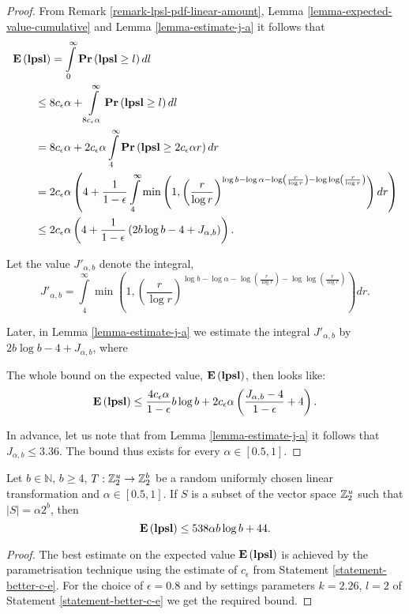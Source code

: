 \begin{proof}
From Remark \ref{remark-lpsl-pdf-linear-amount}, Lemma \ref{lemma-expected-value-cumulative} and Lemma \ref{lemma-estimate-j-a} it follows that
\[
\begin{split}
& \mathbf{E}\left(\mathbf{lpsl}\right)
	= \int\limits_0^\infty \mathbf{Pr}\left(\mathbf{lpsl} \geq l\right) dl \\ 
	& \qquad \leq 8 c_\epsilon \alpha + \int\limits_{8 c_\epsilon \alpha}^\infty \mathbf{Pr}\left(\mathbf{lpsl} \geq l\right) dl \\ 
	& \qquad = 8c_\epsilon \alpha + 2 c_\epsilon \alpha \int\limits_{4}^\infty \mathbf{Pr}\left(\mathbf{lpsl} \geq 2c_\epsilon \alpha r\right) dr \\
	& \qquad = 2c_\epsilon \alpha \left(4 + \frac{1}{1 - \epsilon} \int\limits_{4}^\infty \min\left(1, \left(\frac{r}{\log r}\right)^{\log b - \log \alpha - \log \left(\frac{r}{\log r}\right) - \log \log \left(\frac{r}{\log r}\right)}\right) dr \right) \\ 
	& \qquad \leq 2c_\epsilon \alpha \left( 4 + \frac{1}{1-\epsilon}\left( 2 b \log b - 4 + J_{\alpha, b} \right) \right) \text{.}
\end{split}
\]

Let the value $J'_{\alpha, b}$ denote the integral,
\begin{equation}
\label{equality-j-prime-a-b}
J'_{\alpha, b} = \int\limits_{4}^\infty \min\left(1, \left(\frac{r}{\log r}\right)^{\log b - \log \alpha - \log \left(\frac{r}{\log r}\right) - \log \log \left(\frac{r}{\log r}\right)}\right) dr \text{.}
\end{equation}

Later, in Lemma \ref{lemma-estimate-j-a} we estimate the integral $J'_{\alpha, b}$ by $2 b \log b - 4 +  J_{\alpha, b}$, where

The whole bound on the expected value, $\mathbf{E}\left(\mathbf{lpsl}\right)$, then looks like:
\[
\mathbf{E}\left(\mathbf{lpsl}\right) \leq \frac{4 c_\epsilon \alpha}{1 - \epsilon} b \log b + 2 c_\epsilon \alpha \left( \frac{J_{\alpha, b} - 4}{1 - \epsilon} + 4 \right) \text{.}
\]

In advance, let us note that from Lemma \ref{lemma-estimate-j-a} it follows that $J_{\alpha, b} \leq 3.36$. The bound thus exists for every $\alpha \in [0.5, 1]$.
\end{proof}

\begin{corollary}
\label{corollary-best-elpsl}
Let $b \in \mathbb{N}$, $b \geq 4$, $T: \mathbb{Z}_{2}^{u} \rightarrow \mathbb{Z}_{2}^{b}$ be a random uniformly chosen linear transformation and $\alpha \in \left[0.5, 1\right]$. If $S$ is a subset of the vector space $\mathbb{Z}_{2}^{u}$ such that $|S| = \alpha 2 ^ b$, then \[ \mathbf{E}\left(\mathbf{lpsl}\right) \leq 538 \alpha b \log b + 44 \text{.} \] 
\end{corollary}
\begin{proof}
The best estimate on the expected value $\mathbf{E}\left(\mathbf{lpsl}\right)$ is achieved by the parametrisation technique using the estimate of $c_\epsilon$ from Statement \ref{statement-better-c-e}. For the choice of $\epsilon = 0.8$ and by settings parameters $k = 2.26$, $l = 2$ of Statement \ref{statement-better-c-e} we get the required bound.
\end{proof}
